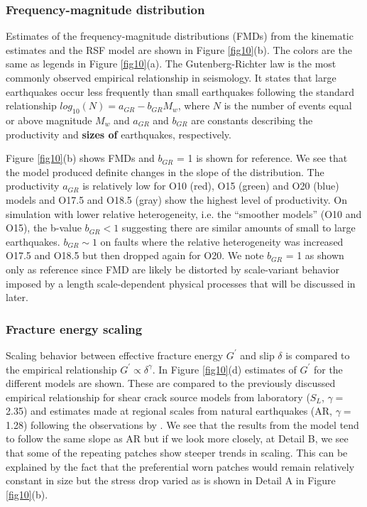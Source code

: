 \documentclass[preprint,1p, 10pt,authoryear]{elsarticle}
\begin{document}
\subsubsection{Frequency-magnitude distribution}
Estimates of the frequency-magnitude distributions (FMDs) from the kinematic estimates and the RSF model are shown in Figure \ref{fig10}(b). The colors are the same as legends in Figure \ref{fig10}(a).  The Gutenberg-Richter \citep{Gutenberg1944} law is the most commonly observed empirical relationship in seismology.  It states that large earthquakes occur less frequently than small earthquakes following the standard relationship $log_{10}(N)= a_{GR} - b_{GR}M_{w}$, where $N$ is the number of events equal or above magnitude $M_{w}$ and $a_{GR}$ and $b_{GR}$ are constants describing the productivity and\textbf{ sizes of }earthquakes, respectively\cite[e.g.][]{Wiemer2002}.  

Figure \ref{fig10}(b) shows FMDs and $b_{GR}$ = 1 is shown for reference. We see that the model produced definite changes in the slope of the distribution.  The productivity $a_{GR}$  is relatively low for O10 (red), O15 (green) and O20 (blue) models and O17.5 and O18.5 (gray) show the highest level of productivity. On simulation with lower relative heterogeneity, i.e. the ``smoother models'' (O10 and O15), the b-value $b_{GR} < 1$ suggesting there are similar amounts of small to large earthquakes.  $b_{GR} \sim 1$ on faults where the relative heterogeneity was increased O17.5 and O18.5 but then dropped again for O20. We note $b_{GR}$ = 1 as shown only as reference since FMD are likely be distorted by scale-variant behavior imposed by a length scale-dependent physical processes that will be discussed in later.

\subsubsection{Fracture energy scaling}
\label{FracEnergy}
Scaling behavior between effective fracture energy $G^{'}$ and slip $\delta$  is compared to the  empirical relationship $G^{'} \propto \delta^{\gamma}$. In Figure \ref{fig10}(d) estimates of $G^{'}$ for the different models are shown. These are compared to the previously discussed empirical relationship for shear crack source models from laboratory ($S_{L}$, $\gamma = $2.35) \citep{Selvadurai2019}  and estimates made at regional scales from natural earthquakes (AR, $\gamma = $1.28) following the observations by \citet{Abercrombie2005}.  We see that the results from the model tend to follow the same slope as AR but if we look more closely, at Detail B, we see that some of the repeating patches show steeper trends in scaling. This can be explained by the fact that the preferential worn patches would remain relatively constant in size but the stress drop varied as is shown in Detail A in Figure \ref{fig10}(b).
\end{document}
